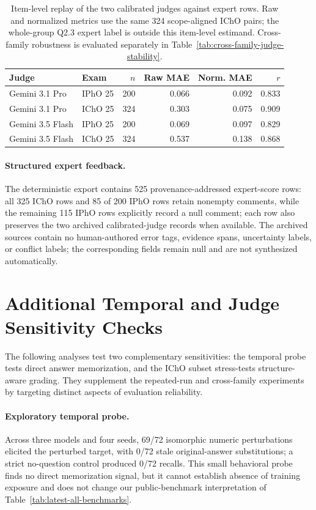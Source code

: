 \documentclass[11pt]{article}
\begin{document}
\begin{table}[t]
\centering
\scriptsize
\setlength{\tabcolsep}{3.2pt}
\begin{tabular}{l l r r r r}
\toprule
\textbf{Judge} & \textbf{Exam} & \textbf{$n$} & \textbf{Raw MAE} & \textbf{Norm. MAE} & \textbf{$r$} \\
\midrule
Gemini 3.1 Pro & IPhO 25 & 200 & 0.066 & 0.092 & 0.833 \\
Gemini 3.1 Pro & IChO 25 & 324 & 0.303 & 0.075 & 0.909 \\
Gemini 3.5 Flash & IPhO 25 & 200 & 0.069 & 0.097 & 0.829 \\
Gemini 3.5 Flash & IChO 25 & 324 & 0.537 & 0.138 & 0.868 \\
\bottomrule
\end{tabular}
\caption{Item-level replay of the two calibrated judges against expert rows. Raw and normalized metrics use the same 324 scope-aligned IChO pairs; the whole-group Q2.3 expert label is outside this item-level estimand. Cross-family robustness is evaluated separately in Table~\ref{tab:cross-family-judge-stability}.}
\label{tab:archived-judge-replay}
\end{table}

\paragraph{Structured expert feedback.}
The deterministic export contains 525 provenance-addressed expert-score rows: all 325 IChO rows and 85 of 200 IPhO rows retain nonempty comments, while the remaining 115 IPhO rows explicitly record a null comment; each row also preserves the two archived calibrated-judge records when available.
The archived sources contain no human-authored error tags, evidence spans, uncertainty labels, or conflict labels; the corresponding fields remain null and are not synthesized automatically.

\section{Additional Temporal and Judge Sensitivity Checks}

The following analyses test two complementary sensitivities: the temporal probe tests direct answer memorization, and the IChO subset stress-tests structure-aware grading. They supplement the repeated-run and cross-family experiments by targeting distinct aspects of evaluation reliability.

\paragraph{Exploratory temporal probe.}
Across three models and four seeds, 69/72 isomorphic numeric perturbations elicited the perturbed target, with 0/72 stale original-answer substitutions; a strict no-question control produced 0/72 recalls.
This small behavioral probe finds no direct memorization signal, but it cannot establish absence of training exposure and does not change our public-benchmark interpretation of Table~\ref{tab:latest-all-benchmarks}.
\end{document}
